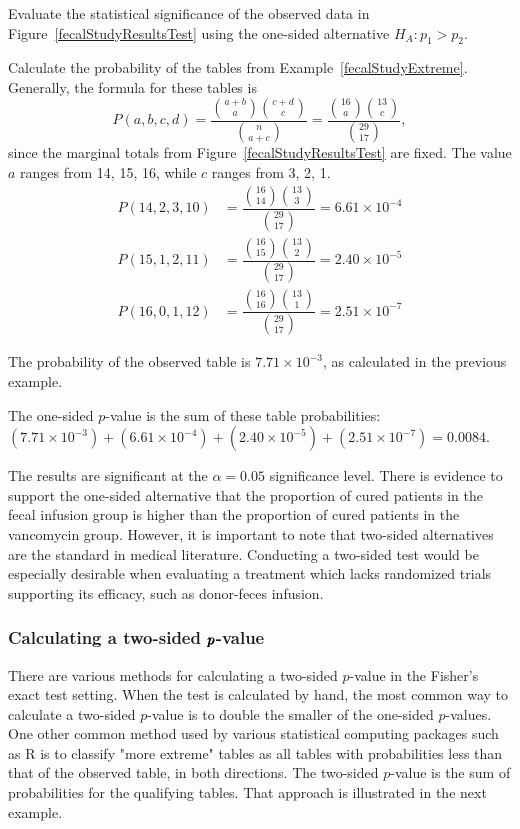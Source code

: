 \begin{examplewrap}
\begin{nexample}{Evaluate the statistical significance of the observed data in Figure~\ref{fecalStudyResultsTest} using the one-sided alternative $H_A: p_1 > p_2$.}

Calculate the probability of the tables from Example~\ref{fecalStudyExtreme}. Generally, the formula for these tables is
\[P(a, b, c, d) = \dfrac{ {a+b \choose a} {c+d \choose c}}{{n \choose a+c}} = \dfrac{ {16 \choose a} {13 \choose c}}{{29 \choose 17}},\]
since the marginal totals from Figure~\ref{fecalStudyResultsTest} are fixed. The value $a$ ranges from 14, 15, 16, while $c$ ranges from 3, 2, 1.
\begin{align*}
P(14, 2, 3, 10) &= \dfrac{ {16 \choose 14} {13 \choose 3}}{{29 \choose 17}} = 6.61 \times 10^{-4} \\
P(15, 1, 2, 11) &= \dfrac{ {16 \choose 15} {13 \choose 2}}{{29 \choose 17}} = 2.40 \times 10^{-5} \\
P(16, 0, 1, 12) &= \dfrac{ {16 \choose 16} {13 \choose 1}}{{29 \choose 17}} = 2.51 \times 10^{-7}
\end{align*}

The probability of the observed table is $7.71 \times 10^{-3}$, as calculated in the previous example.

The one-sided $p$-value is the sum of these table probabilities: $(7.71 \times 10^{-3}) + (6.61 \times 10^{-4}) + (2.40 \times 10^{-5}) + (2.51 \times 10^{-7}) = 0.0084.$

The results are significant at the $\alpha = 0.05$ significance level. There is evidence to support the one-sided alternative that the proportion of cured patients in the fecal infusion group is higher than the proportion of cured patients in the vancomycin group. However, it is important to note that two-sided alternatives are the standard in medical literature. Conducting a two-sided test would be especially desirable when evaluating a treatment which lacks randomized trials supporting its efficacy, such as donor-feces infusion.
\end{nexample}
\end{examplewrap}


\subsubsection{Calculating a two-sided $\pmb{\MakeLowercase{p}}$-value}

There are various methods for calculating a two-sided $p$-value in the Fisher's exact test setting. When the test is calculated by hand, the most common way to calculate a two-sided $p$-value is to double the smaller of the one-sided $p$-values. One other common method used by various statistical computing packages such as \textsf{R} is to classify "more extreme" tables as all tables with probabilities less than that of the observed table, in both directions. The two-sided $p$-value is the sum of probabilities for the qualifying tables.  That approach is illustrated in the next example.

